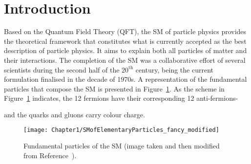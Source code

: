 \section{Introduction}
\label{sec:chap1:SM_and_EParticles}
Based on the Quantum Field Theory (QFT), the SM of particle physics provides the theoretical framework that constitutes what is 
currently accepted as the best description of particle physics. It aims to explain both all particles of matter and
 their interactions. The completion of the SM was a collaborative effort of several scientists during the second half of the
$20^\text{th}$ century, being the current formulation finalised in the decade of 1970s. A representation of the fundamental particles 
that compose the SM is presented in Figure~\ref{fig:Chap1:SM}.
 As the scheme in Figure~\ref{fig:Chap1:SM} indicates, the 
12 fermions have their corresponding 12 anti-fermions-

 and the quarks and gluons carry colour charge. 
\begin{figure}
    \centering
    \texttt{[image: Chapter1/SMofElementaryParticles\_fancy\_modified]}
    \caption{Fundamental particles of the SM (image taken and then modified from Reference~\cite{Purcell:1473657}). }
    \label{fig:Chap1:SM}
\end{figure}




